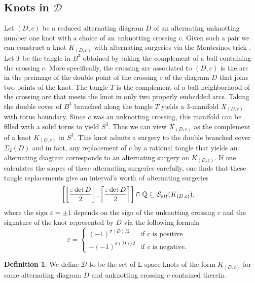 \documentclass{amsart} %
\newcommand{\D}{\mathcal{D}}
\newcommand{\Q}{\mathbb{Q}}
\newcommand{\Salt}{\mathcal{S}_{\rm alt}}
\theoremstyle{thm}
\theoremstyle{definition}
\newtheorem{defi}[Theorem]{Definition}
\numberwithin{equation}{section}
\begin{document}
\subsection{Knots in \texorpdfstring{$\D$}{D}}\label{sec:D_definition}
Let $(D,c)$ be a reduced alternating diagram $D$ of an alternating unknotting number one knot with a choice of an unknotting crossing $c$. Given such a pair we can construct a knot $K_{(D,c)}$ with alternating surgeries via the Montesinos trick \cite{Montesinos_trick}. Let $T$ be the tangle in $B^3$ obtained by taking the complement of a ball containing the crossing $c$. More specifically, the crossing arc associated to $(D,c)$ is the arc in the preimage of the double point of the crossing $c$ of the diagram $D$ that joins two points of the knot. The tangle $T$ is the complement of a ball neighborhood of the crossing arc that meets the knot in only two properly embedded arcs. Taking the double cover of $B^3$ branched along the tangle $T$ yields a 3-manifold $X_{(D,c)}$ with torus boundary. Since $c$ was an unknotting crossing, this manifold can be filled with a solid torus to yield $S^3$. Thus we can view $X_{(D,c)}$ as the complement of a knot $K_{(D,c)}$ in $S^3$. This knot admits a surgery to the double branched cover $\Sigma_2(D)$ and in fact, any replacement of $c$ by a rational tangle that yields an alternating diagram corresponds to an alternating surgery on $K_{(D,c)}$. If one calculates the slopes of these alternating surgeries carefully, one finds that these tangle replacements give an interval's worth of alternating surgeries \cite[Proposition ~5.3]{Mc15}
\begin{equation}\label{eq:intervalinSalt}
\left[ \left\lfloor \frac{\varepsilon \det D}{2} \right\rfloor, \left\lceil \frac{\varepsilon \det D}{2} \right\rceil \right]\cap \Q \subseteq \Salt(K_{(D,c)}),
\end{equation}
where the sign $\varepsilon = \pm 1$ depends on the sign of the unknotting crossing $c$ and the signature of the knot represented by $D$ via the following formula
\[
\varepsilon = \begin{cases}
(-1)^{\sigma(D)/2} &\text{if $c$ is positive}\\
-(-1)^{\sigma(D)/2} &\text{if $c$ is negative}.
\end{cases}
\]
\begin{defi}
We define $\D$ to be the set of L-space knots of the form $K_{(D,c)}$ for some alternating diagram $D$ and unknotting crossing $c$ contained therein.
\end{defi}
\end{document}
